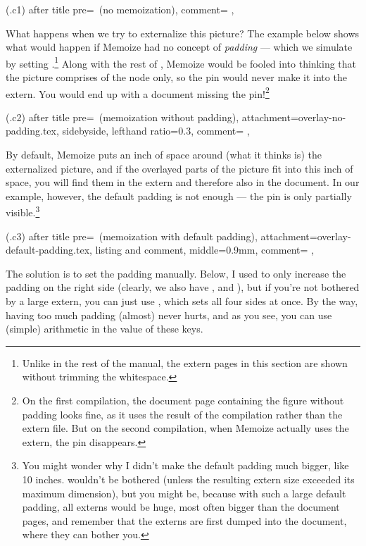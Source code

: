 \documentclass[a4paper,11pt]{article}
\begin{document}
(.c1){
  after title pre={\ (no memoization)},
  comment={\centering
  },
}

What happens when we try to externalize this picture?  The example below shows
what would happen if Memoize had no concept of \emph{padding} --- which we
simulate by setting .\footnote{Unlike in the rest of
  the manual, the extern pages in this section are shown without trimming the
  whitespace.}  Along with the rest of , Memoize would be fooled
into thinking that the picture comprises of the node only, so the pin would
never make it into the extern.  You would end up with a document missing the
pin!\footnote{On the first compilation, the document page containing the figure
  without padding looks fine, as it uses the result of the compilation rather
  than the extern file.  But on the second compilation, when Memoize actually
  uses the extern, the pin disappears.}

(.c2){
  after title pre={\ (memoization without padding)},
  attachment=overlay-no-padding.tex,
  sidebyside, lefthand ratio=0.3,
  comment={\centering
  },
}


By default, Memoize puts an inch of space around (what it thinks is) the
externalized picture, and if the overlayed parts of the picture fit into this
inch of space, you will find them in the extern and therefore also in the
document.  In our example, however, the default padding is not enough --- the
pin is only partially visible.\footnote{You might wonder why I didn't make the
  default padding much bigger, like 10 inches.   wouldn't be
  bothered (unless the resulting extern size exceeded its maximum dimension),
  but you might be, because with such a large default padding, all externs
  would be huge, most often bigger than the document pages, and remember that
  the externs are first dumped into the document, where they can bother you.}

(.c3){
  after title pre={\ (memoization with default padding)},
  attachment=overlay-default-padding.tex,
  listing and comment,
  middle=0.9mm,
  comment={\centering
  },
}

The solution is to set the padding manually.  Below, I used  to only increase the padding on the right side (clearly, we also have
,  and ), but
if you're not bothered by a large extern, you can just use
, which sets all four sides at once.  By the way, having
too much padding (almost) never hurts, and as you see, you can use (simple)
arithmetic in the value of these keys.
\end{document}
